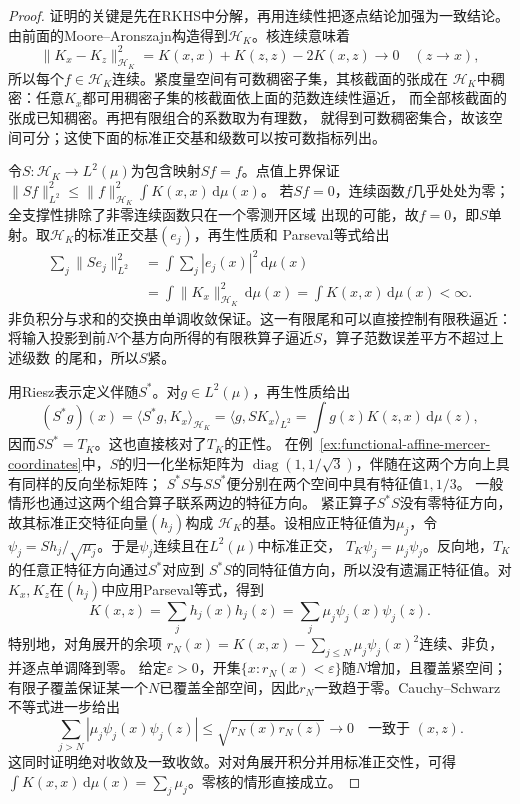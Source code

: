 \begin{proof}
证明的关键是先在RKHS中分解，再用连续性把逐点结论加强为一致结论。
由前面的Moore--Aronszajn构造得到$\mathcal H_K$。核连续意味着
\[
 \lVert K_x-K_z\rVert_{\mathcal H_K}^2
 =K(x,x)+K(z,z)-2K(x,z)\longrightarrow0\quad(z\to x),
\]
所以每个$f\in\mathcal H_K$连续。紧度量空间有可数稠密子集，其核截面的张成在
$\mathcal H_K$中稠密：任意$K_x$都可用稠密子集的核截面依上面的范数连续性逼近，
而全部核截面的张成已知稠密。再把有限组合的系数取为有理数，
就得到可数稠密集合，故该空间可分；这使下面的标准正交基和级数可以按可数指标列出。

令$S:\mathcal H_K\to L^2(\mu)$为包含映射$Sf=f$。点值上界保证
$\lVert Sf\rVert_{L^2}^2\leq\lVert f\rVert_{\mathcal H_K}^2\int K(x,x)\,\mathrm d\mu(x)$。
若$Sf=0$，连续函数$f$几乎处处为零；全支撑性排除了非零连续函数只在一个零测开区域
出现的可能，故$f=0$，即$S$单射。取$\mathcal H_K$的标准正交基$(e_j)$，再生性质和
Parseval等式给出
\[
 \begin{aligned}
 \sum_j\lVert Se_j\rVert_{L^2}^2
 &=\int\sum_j|e_j(x)|^2\,\mathrm d\mu(x)\\
 &=\int\lVert K_x\rVert_{\mathcal H_K}^2\,\mathrm d\mu(x)
 =\int K(x,x)\,\mathrm d\mu(x)<\infty.
 \end{aligned}
\]
非负积分与求和的交换由单调收敛保证。这一有限尾和可以直接控制有限秩逼近：
将输入投影到前$N$个基方向所得的有限秩算子逼近$S$，算子范数误差平方不超过上述级数
的尾和，所以$S$紧。

用Riesz表示定义伴随$S^*$。对$g\in L^2(\mu)$，再生性质给出
\[
 (S^*g)(x)=\langle S^*g,K_x\rangle_{\mathcal H_K}
 =\langle g,SK_x\rangle_{L^2}
 =\int g(z)K(z,x)\,\mathrm d\mu(z),
\]
因而$SS^*=T_K$。这也直接核对了$T_K$的正性。
在例~\ref{ex:functional-affine-mercer-coordinates}中，$S$的归一化坐标矩阵为
$\operatorname{diag}(1,1/\sqrt3)$，伴随在这两个方向上具有同样的反向坐标矩阵；
$S^*S$与$SS^*$便分别在两个空间中具有特征值$1,1/3$。
一般情形也通过这两个组合算子联系两边的特征方向。
紧正算子$S^*S$没有零特征方向，故其标准正交特征向量$(h_j)$构成
$\mathcal H_K$的基。设相应正特征值为$\mu_j$，令
$\psi_j=Sh_j/\sqrt{\mu_j}$。于是$\psi_j$连续且在$L^2(\mu)$中标准正交，
$T_K\psi_j=\mu_j\psi_j$。反向地，$T_K$的任意正特征方向通过$S^*$对应到
$S^*S$的同特征值方向，所以没有遗漏正特征值。对$K_x,K_z$在$(h_j)$中应用Parseval等式，得到
\[
 K(x,z)=\sum_j h_j(x)h_j(z)
       =\sum_j\mu_j\psi_j(x)\psi_j(z).
\]
特别地，对角展开的余项
$r_N(x)=K(x,x)-\sum_{j\leq N}\mu_j\psi_j(x)^2$连续、非负，并逐点单调降到零。
给定$\varepsilon>0$，开集$\{x:r_N(x)<\varepsilon\}$随$N$增加，且覆盖紧空间；
有限子覆盖保证某一个$N$已覆盖全部空间，因此$r_N$一致趋于零。Cauchy--Schwarz
不等式进一步给出
\[
 \sum_{j>N}|\mu_j\psi_j(x)\psi_j(z)|
 \leq\sqrt{r_N(x)r_N(z)}\longrightarrow0
 \quad\text{一致于 }(x,z).
\]
这同时证明绝对收敛及一致收敛。对对角展开积分并用标准正交性，可得
$\int K(x,x)\,\mathrm d\mu(x)=\sum_j\mu_j$。零核的情形直接成立。
\end{proof}


